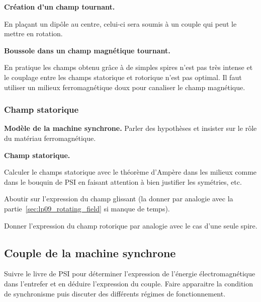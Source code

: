 \begin{slide}
\textbf{Création d'un champ tournant.}
\end{slide}

En plaçant un dipôle au centre, celui-ci sera soumis à un couple qui peut le mettre en rotation.

\begin{experience}
\textbf{Boussole dans un champ magnétique tournant.}
\end{experience}

\begin{transition}
En pratique les champs obtenu grâce à de simples spires n'est pas très intense et le couplage entre les champs statorique et rotorique n'est pas optimal.
Il faut utiliser un milieux ferromagnétique doux pour canaliser le champ magnétique.
\end{transition}

\subsubsection{Champ statorique}

\begin{slide}
\textbf{Modèle de la machine synchrone.}
Parler des hypothèses et insister sur le rôle du matériau ferromagnétique.
\end{slide}

\begin{slide}
\textbf{Champ statorique.}
\end{slide}

Calculer le champs statorique avec le théorème d'Ampère dans les milieux comme dans le bouquin de PSI en faisant attention à bien justifier les symétries, etc.

Aboutir sur l'expression du champ glissant (la donner par analogie avec la partie~\ref{sec:lp09_rotating_field} si manque de temps).

Donner l'expression du champ rotorique par analogie avec le cas d'une seule spire.

\subsection{Couple de la machine synchrone}

Suivre le livre de PSI pour déterminer l'expression de l'énergie électromagnétique dans l'entrefer et en déduire l'expression du couple.
Faire apparaitre la condition de synchronisme puis discuter des différents régimes de fonctionnement. 


